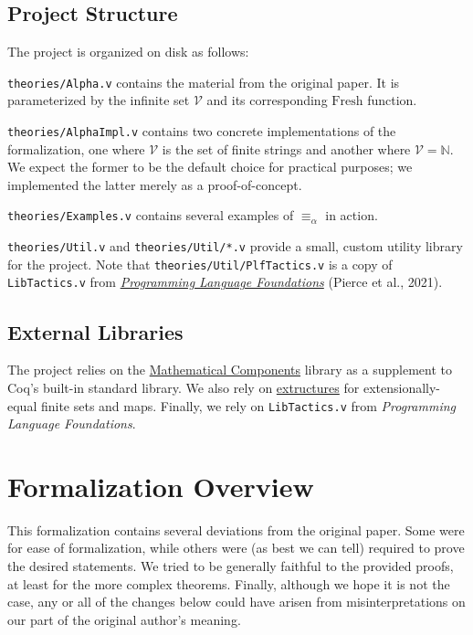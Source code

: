 \documentclass{article}
\begin{document}
\subsection{Project Structure}

The project is organized on disk as follows:

\verb|theories/Alpha.v| contains the material from the original paper. It is parameterized by the
infinite set $\mathcal{V}$ and its corresponding $\textrm{Fresh}$ function.

\verb|theories/AlphaImpl.v| contains two concrete implementations of the formalization, one where
$\mathcal{V}$ is the set of finite strings and another where $\mathcal{V} = \mathbb{N}$. We expect
the former to be the default choice for practical purposes; we implemented the latter merely as a
proof-of-concept.

\verb|theories/Examples.v| contains several examples of $\equiv_\alpha$ in action.

\verb|theories/Util.v| and \verb|theories/Util/*.v| provide a small, custom utility library for the
project. Note that \verb|theories/Util/PlfTactics.v| is a copy of \verb|LibTactics.v| from
\href{https://softwarefoundations.cis.upenn.edu/plf-current/}{\emph{Programming Language
Foundations}} (Pierce et al., 2021).

\subsection{External Libraries}

The project relies on the \href{https://math-comp.github.io}{Mathematical Components} library as a
supplement to Coq's built-in standard library. We also rely on
\href{https://github.com/arthuraa/extructures}{extructures} for extensionally-equal finite sets and
maps. Finally, we rely on \verb|LibTactics.v| from \emph{Programming Language Foundations}.

\section{Formalization Overview}

This formalization contains several deviations from the original paper. Some were for ease of
formalization, while others were (as best we can tell) required to prove the desired statements. We
tried to be generally faithful to the provided proofs, at least for the more complex theorems.
Finally, although we hope it is not the case, any or all of the changes below could have arisen from
misinterpretations on our part of the original author's meaning.
\end{document}
